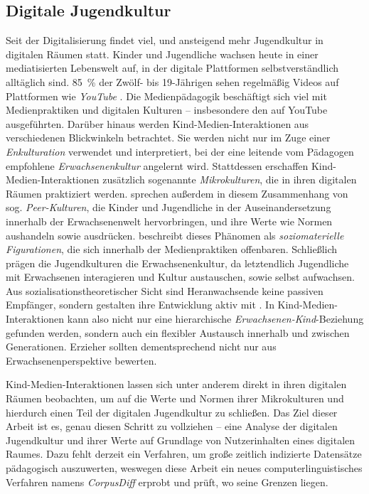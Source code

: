 \subsection{Digitale Jugendkultur}
Seit der Digitalisierung findet viel, und ansteigend mehr Jugendkultur in digitalen Räumen statt.
Kinder und Jugendliche wachsen heute in einer mediatisierten Lebenswelt auf, in der digitale Plattformen selbstverständlich alltäglich sind.
85~\% der Zwölf- bis 19-Jährigen sehen regelmäßig Videos auf Plattformen wie \emph{YouTube} \autocite{JIM24}.
Die Medienpädagogik beschäftigt sich viel mit Medienpraktiken und digitalen Kulturen -- insbesondere den auf YouTube ausgeführten.
Darüber hinaus werden Kind-Medien-Interaktionen aus verschiedenen Blickwinkeln betrachtet.
Sie werden nicht nur im Zuge einer \emph{Enkulturation} verwendet und interpretiert, bei der eine leitende vom Pädagogen empfohlene \emph{Erwachsenenkultur} angelernt wird.
Stattdessen erschaffen Kind-Medien-Interaktionen zusätzlich sogenannte \emph{Mikrokulturen}, die in ihren digitalen Räumen praktiziert werden.
\textcite{CE90} sprechen außerdem in diesem Zusammenhang von sog. \emph{Peer-Kulturen}, die Kinder und Jugendliche in der Auseinandersetzung innerhalb der Erwachsenenwelt hervorbringen, und ihre Werte wie Normen aushandeln sowie ausdrücken.
\textcite{Sch21} beschreibt dieses Phänomen als \emph{soziomaterielle Figurationen}, die sich innerhalb der Medienpraktiken offenbaren.
Schließlich prägen die Jugendkulturen die Erwachsenenkultur, da letztendlich Jugendliche mit Erwachsenen interagieren und Kultur austauschen, sowie selbst aufwachsen.
Aus sozialisationstheoretischer Sicht sind Heranwachsende keine passiven Empfänger, sondern gestalten ihre Entwicklung aktiv mit \autocite{BH21}.
In Kind-Medien-Interaktionen kann also nicht nur eine hierarchische \emph{Erwachsenen-Kind}-Beziehung gefunden werden, sondern auch ein flexibler Austausch innerhalb und zwischen Generationen.
Erzieher sollten dementsprechend nicht nur aus Erwachsenenperspektive bewerten.

Kind-Medien-Interaktionen lassen sich unter anderem direkt in ihren digitalen Räumen beobachten, um auf die Werte und Normen ihrer Mikrokulturen und hierdurch einen Teil der digitalen Jugendkultur zu schließen.
Das Ziel dieser Arbeit ist es, genau diesen Schritt zu vollziehen -- eine Analyse der digitalen Jugendkultur und ihrer Werte auf Grundlage von Nutzerinhalten eines digitalen Raumes.
Dazu fehlt derzeit ein Verfahren, um große zeitlich indizierte Datensätze pädagogisch auszuwerten, weswegen diese Arbeit ein neues computerlinguistisches Verfahren namens \emph{CorpusDiff} erprobt und prüft, wo seine Grenzen liegen.

